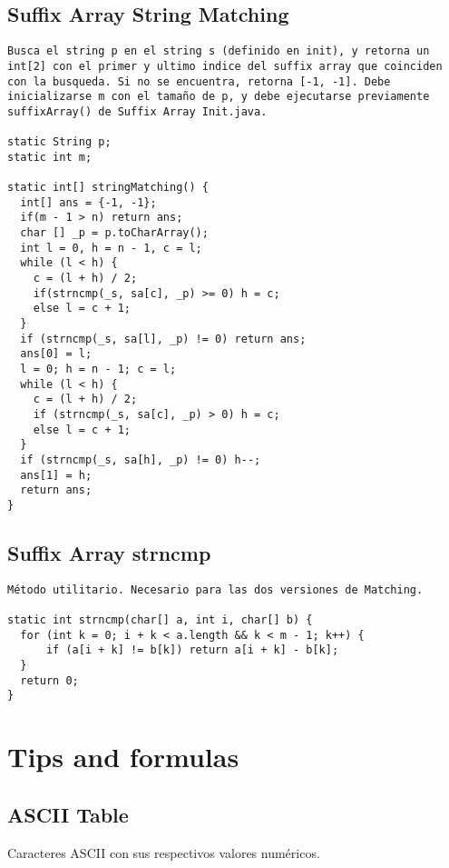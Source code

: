 \documentclass[10pt,letterpaper,twocolumn,twosided]{article}
\begin{document}
\subsection{Suffix Array String Matching}
\begin{lstlisting}
Busca el string p en el string s (definido en init), y retorna un int[2] con el primer y ultimo indice del suffix array que coinciden con la busqueda. Si no se encuentra, retorna [-1, -1]. Debe inicializarse m con el tamaño de p, y debe ejecutarse previamente suffixArray() de Suffix Array Init.java.

static String p;
static int m;

static int[] stringMatching() {
  int[] ans = {-1, -1};
  if(m - 1 > n) return ans;
  char [] _p = p.toCharArray();
  int l = 0, h = n - 1, c = l;
  while (l < h) {
    c = (l + h) / 2;
    if(strncmp(_s, sa[c], _p) >= 0) h = c;
    else l = c + 1;
  }
  if (strncmp(_s, sa[l], _p) != 0) return ans;
  ans[0] = l;
  l = 0; h = n - 1; c = l;
  while (l < h) {
    c = (l + h) / 2;
    if (strncmp(_s, sa[c], _p) > 0) h = c;
    else l = c + 1;
  }
  if (strncmp(_s, sa[h], _p) != 0) h--;
  ans[1] = h;
  return ans;
} \end{lstlisting}

\subsection{Suffix Array strncmp}
\begin{lstlisting}
Método utilitario. Necesario para las dos versiones de Matching.

static int strncmp(char[] a, int i, char[] b) {
  for (int k = 0; i + k < a.length && k < m - 1; k++) {
      if (a[i + k] != b[k]) return a[i + k] - b[k];
  }
  return 0;
}\end{lstlisting}

\section{Tips and formulas}

\subsection{ASCII Table}
Caracteres ASCII con sus respectivos valores numéricos.
\end{document}
